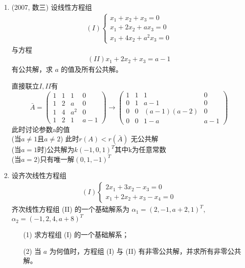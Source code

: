 \documentclass[12pt, a4paper, oneside, UTF8]{ctexbook}
\begin{document}
\begin{enumerate}[label=\arabic*.,start=12]
    \item (2007, 数三) 设线性方程组
    \begin{align*}
    (I) \begin{cases}
    x_1 + x_2 + x_3 = 0 \\
    x_1 + 2x_2 + a x_3 = 0 \\
    x_1 + 4x_2 + a^2 x_3 = 0
    \end{cases}
    \end{align*}
    与方程
    \begin{align*}
    (II) x_1 + 2x_2 + x_3 = a - 1
    \end{align*}
    有公共解，求 $a$ 的值及所有公共解。
    
    \begin{solution}
    直接联立$I,II$有
    $$
    \bar{A} = \begin{pmatrix}
        1 & 1 & 1 & 0 \\
        1 & 2 & a & 0 \\
        1 & 4 & a^2 & 0 \\
        1 & 2 & 1 & a - 1
    \end{pmatrix} \rightarrow \begin{pmatrix}
        1 & 1 & 1 & 0 \\
        0 & 1 & a - 1 & 0 \\
        0 & 0 & (a-1)(a-2)& 0 \\
        0 & 0 & 1-a & a-1
    \end{pmatrix}
    $$
    此时讨论参数a的值 \\
    (当$a\neq 1$且$a\neq 2$) 此时$r(A)<r(\bar{A})$ 无公共解 \\
    (当$a=1$时)公共解为$k(-1,0,1)^{T}$其中k为任意常数  \\
    (当$a=2$)只有唯一解$(0,1,-1)^{T}$
    \end{solution}
    
    \item 设齐次线性方程组
    \begin{align*}
    (I) \begin{cases}
    2x_1 + 3x_2 - x_3 = 0 \\
    x_1 + 2x_2 + x_3 - x_4 = 0
    \end{cases}
    \end{align*}
    齐次线性方程组 (II) 的一个基础解系为 $\alpha_1 = (2, -1, a+2, 1)^T$, $\alpha_2 = (-1, 2, 4, a+8)^T$ 
    \begin{enumerate}
        \item [(1)] 求方程组 (I) 的一个基础解系；
        \item [(2)] 当 $a$ 为何值时，方程组 (I) 与 (II) 有非零公共解，并求所有非零公共解。
    \end{enumerate}
    

\end{enumerate}
\end{document}
